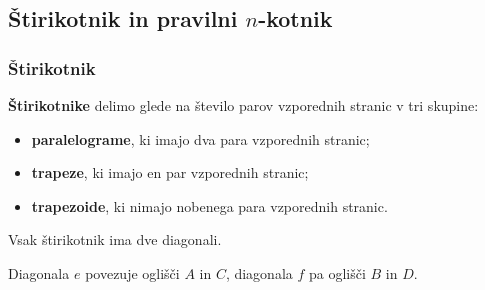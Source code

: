     \subsection{Štirikotnik in pravilni $n$-kotnik}

        \begin{frame}
            \frametitle{Štirikotnik}

            \begin{block}{}
                \textbf{Štirikotnike} delimo glede na število parov vzporednih stranic v tri skupine:
                \begin{itemize}
                    \item \textbf{paralelograme}, ki imajo dva para vzporednih stranic;
                    \item \textbf{trapeze}, ki imajo en par vzporednih stranic;
                    \item \textbf{trapezoide}, ki nimajo nobenega para vzporednih stranic.
                \end{itemize}
            \end{block}

            \begin{block}{}
                Vsak štirikotnik ima dve diagonali. 

                Diagonala $e$ povezuje oglišči $A$ in $C$, diagonala $f$ pa oglišči $B$ in $D$.
            \end{block}

        \end{frame}


